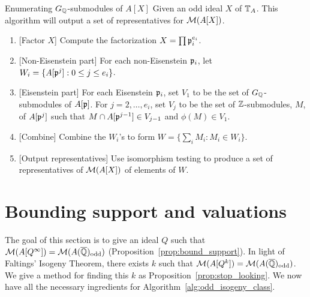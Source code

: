 \begin{algorithm}{Enumerating $G_{\mathbb{Q}}$-submodules of {$A[X]$}}%
    \label{alg:enumerating_AX}
    Given an odd ideal $X$ of $\mathbb{T}_A$. This algorithm will output a set of
    representatives for $\mathcal{M}(A[X])$.
    \begin{enumerate}
        \item{} [Factor $X$]
            Compute the factorization $X=\prod \mathfrak{p}_i ^{e_i}$.
        \item{} [Non-Eisenstein part]
            For each non-Eisenstein $\mathfrak{p}_i$, let $W_i=\{A[\mathfrak{p}^j]: 0 \leq j
            \leq e_i\}$.
        \item{} [Eisenstein part]
            For each Eisenstein $\mathfrak{p}_i$, set $V_1$ to be the set of
            $G_{\mathbb{Q}}$-submodules of $A[\mathfrak{p}]$. For $j=2,\ldots,e_i$, set $V_j$ to
            be the set of $\mathbb{Z}$-submodules, $M$, of $A[\mathfrak{p}^j]$ such that $M\cap
            A[\mathfrak{p}^{j-1}]\in V_{j-1}$ and $\phi(M)\in V_1$.
        \item{} [Combine]
            Combine the $W_i$'s to form $W=\{\sum_i M_i: M_i \in W_i\}$.
        \item{} [Output representatives]
            Use isomorphism testing 
            to produce a set of representatives of $\mathcal{M}(A[X])$ of elements of
            $W$.
    \end{enumerate}
\end{algorithm}

\section{Bounding support and valuations}%
\label{sec:bounding_support_and_valuations}

The goal of this section is to give an ideal $Q$ such that
$\mathcal{M}(A[Q^\infty])=\mathcal{M}(A(\overline{\mathbb{Q}})_{\mathrm{odd}})$ (Proposition~\ref{prop:bound_support}). In
light of Faltings' Isogeny Theorem, there exists $k$ such that
$\mathcal{M}(A[Q^k])=\mathcal{M}(A(\overline{\mathbb{Q}})_{\mathrm{odd}})$. We give a method for finding this $k$ as
Proposition~\ref{prop:stop_looking}. We now have all the necessary ingredients
for Algorithm~\ref{alg:odd_isogeny_class}.

